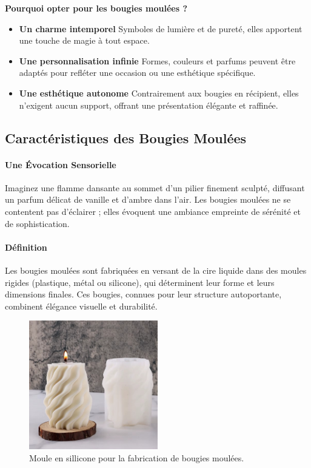 \documentclass[11pt,fleqn,onecolumn,oneside]{book}
\begin{document}
\begin{definition}
\textbf{Pourquoi opter pour les bougies moulées ?}
\begin{itemize}
    \item \textbf{Un charme intemporel} Symboles de lumière et de pureté, elles apportent une touche de magie à tout espace.
    \item \textbf{Une personnalisation infinie} Formes, couleurs et parfums peuvent être adaptés pour refléter une occasion ou une esthétique spécifique.
    \item \textbf{Une esthétique autonome} Contrairement aux bougies en récipient, elles n’exigent aucun support, offrant une présentation élégante et raffinée.
\end{itemize}
\end{definition}

\subsection*{Caractéristiques des Bougies Moulées}

\paragraph{Une Évocation Sensorielle}
Imaginez une flamme dansante au sommet d'un pilier finement sculpté, diffusant un parfum délicat de vanille et d’ambre dans l’air. Les bougies moulées ne se contentent pas d’éclairer ; elles évoquent une ambiance empreinte de sérénité et de sophistication.

\paragraph{Définition}
Les bougies moulées sont fabriquées en versant de la cire liquide dans des moules rigides (plastique, métal ou silicone), qui déterminent leur forme et leurs dimensions finales. Ces bougies, connues pour leur structure autoportante, combinent élégance visuelle et durabilité.

\begin{figure}[H]
    \centering
    \includegraphics[width=0.5\textwidth]{Pictures/images/chapitre2/moule-sillicone.jpg}
    \caption{Moule en sillicone pour la fabrication de bougies moulées.}
    \label{fig:bougie_sillicone_2}
\end{figure}
\end{document}
